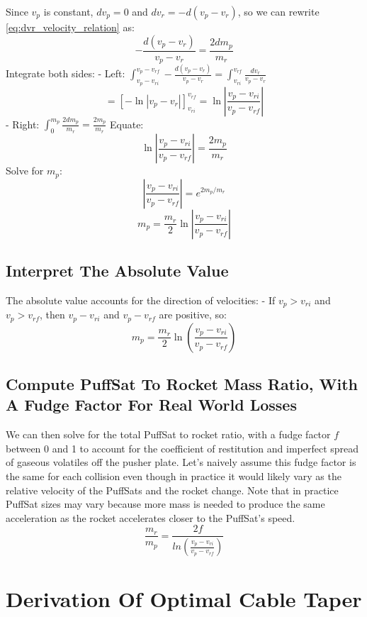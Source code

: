 \documentclass{article}
\begin{document}
Since \(v_p\) is constant,  \(dv_p = 0\) and  \(dv_r = -d(v_p-v_r)\), so we can rewrite \autoref{eq:dvr_velocity_relation} as:
\[
-\frac{d(v_p - v_r)}{v_p - v_r} = \frac{2 dm_p}{m_r}
\]
Integrate both sides:
- Left: \( \int_{v_p - v_{ri}}^{v_p - v_{rf}} -\frac{d(v_p - v_r)}{v_p - v_r} = \int_{v_{ri}}^{v_{rf}} \frac{dv_r}{v_p - v_r} \)
\[
= \left[ -\ln|v_p - v_r| \right]_{v_{ri}}^{v_{rf}} = \ln \left| \frac{v_p - v_{ri}}{v_p - v_{rf}} \right|
\]
- Right: \( \int_0^{m_p} \frac{2 dm_p}{m_r} = \frac{2 m_p}{m_r} \)
Equate:
\[
\ln \left| \frac{v_p - v_{ri}}{v_p - v_{rf}} \right| = \frac{2 m_p}{m_r}
\]
Solve for \( m_p \):
\[
\left| \frac{v_p - v_{ri}}{v_p - v_{rf}} \right| = e^{2 m_p / m_r}
\]
\begin{equation}
m_p = \frac{m_r}{2} \ln \left| \frac{v_p - v_{ri}}{v_p - v_{rf}} \right| 
\end{equation}
\subsection{Interpret The Absolute Value}   
The absolute value accounts for the direction of velocities:
- If \( v_p > v_{ri} \) and \( v_p > v_{rf} \),  then \( v_p - v_{ri} \) and \( v_p - v_{rf} \) are positive, so:
\[
m_p = \frac{m_r}{2} \ln \left( \frac{v_p - v_{ri}}{v_p - v_{rf}} \right)
\]
\subsection{Compute PuffSat To Rocket Mass Ratio, With A Fudge Factor For Real World Losses}

We can then solve for the total PuffSat to rocket ratio, with a fudge factor $f$ between 0 and 1 to account for the coefficient of restitution and imperfect spread of gaseous volatiles off the pusher plate.   Let's naively assume this fudge factor is the same for each collision even though in practice it would likely vary as the relative velocity of the PuffSats and the rocket change.  Note that in practice PuffSat sizes may vary because more mass is needed to produce the same acceleration as the rocket accelerates closer to the PuffSat's speed.
\begin{equation}
\frac{m_r}{m_p} = \frac{2f}{ln(\frac{v_p-v_{ri}}{v_p-v_{rf}})}\label{eq:PuffSat_ratio}
\end{equation}

\section{Derivation Of Optimal Cable Taper}\label{sec:breaking_length_derived}
\end{document}
